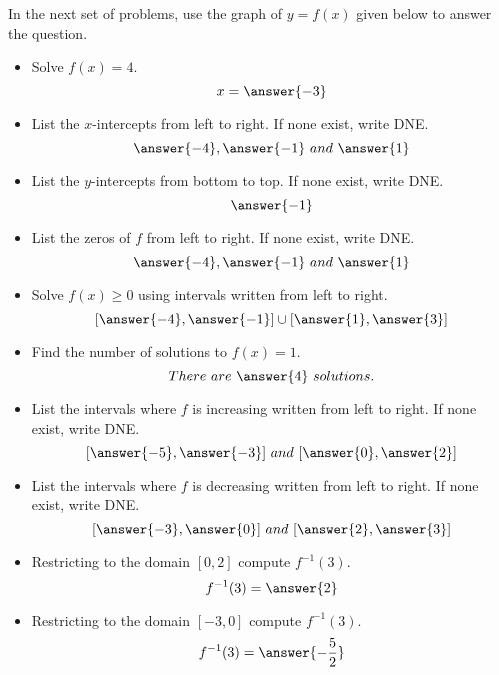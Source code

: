 \documentclass{ximera}
\author{Carl Stitz \and Jeff Zeager \and Bart Snapp \and Matthew Carr}
\begin{document}
\begin{exercise}
In the next set of problems, use the graph of $y = f(x)$ given below
to answer the question.
\begin{image}
\end{image}
\begin{itemize}
\item Solve $f(x) = 4$. \[x=\answer{-3}\]
\item List the $x$-intercepts from left to right. If none exist, write
  DNE. \[\answer{-4}, \answer{-1}\ and\ \answer{1}\]
\item List the $y$-intercepts from bottom to top. If none exist, write
  DNE. \[\answer{-1}\]
\item List the zeros of $f$ from left to right. If none exist, write
  DNE. \[\answer{-4}, \answer{-1}\ and\ \answer{1}\]
\item Solve $f(x) \geq 0$ using intervals written from left to right. \[[\answer{-4},\answer{-1}]\cup[\answer{1},\answer{3}]\]
\item Find the number of solutions to $f(x) = 1$. \[There\ are\ \answer{4}\ solutions.\]
\item List the intervals where $f$ is increasing written from left to right. If none exist, write DNE. \[[\answer{-5},\answer{-3}]\ and\ [\answer{0},\answer{2}]\]
\item List the intervals where $f$ is decreasing written from left to right. If none exist, write DNE. \[[\answer{-3},\answer{0}]\ and\ [\answer{2},\answer{3}]\]
\item Restricting to the domain $[0,2]$ compute $f^{-1}(3)$. \[f^{-1}(3)=\answer{2}\]
\item Restricting to the domain $[-3,0]$ compute $f^{-1}(3)$. \[f^{-1}(3)=\answer{-\frac{5}{2}}\]
\end{itemize}
\end{exercise}
\end{document}
